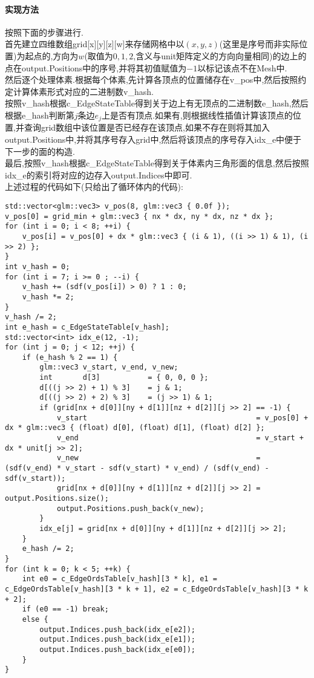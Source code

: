 \documentclass{ctexart}
\begin{document}
\paragraph{实现方法}
按照下面的步骤进行.\\
\indent 首先建立四维数组{\codefont grid[x][y][z][w]}来存储网格中以$(x,y,z)$(这里是序号而非实际位置)为起点的,方向为$w$(取值为$0,1,2$,含义与{\codefont unit}矩阵定义的方向向量相同)的边上的点在{\codefont output.Positions}中的序号,并将其初值赋值为$-1$以标记该点不在Mesh中.\\
\indent 然后逐个处理体素.根据每个体素,先计算各顶点的位置储存在{\codefont v\_pos}中,然后按照约定计算体素形式对应的二进制数{\codefont v\_hash}.\\
\indent 按照{\codefont v\_hash}根据{\codefont c\_EdgeStateTable}得到关于边上有无顶点的二进制数{\codefont e\_hash},然后根据{\codefont e\_hash}判断第$j$条边$e_j$上是否有顶点.如果有,则根据线性插值计算该顶点的位置,并查询{\codefont grid}数组中该位置是否已经存在该顶点,如果不存在则将其加入{\codefont output.Positions}中,并将其序号存入{\codefont grid}中,然后将该顶点的序号存入{\codefont idx\_e}中便于下一步的面的构造.\\
\indent 最后,按照{\codefont v\_hash}根据{\codefont c\_EdgeStateTable}得到关于体素内三角形面的信息,然后按照{\codefont idx\_e}的索引将对应的边存入{\codefont output.Indices}中即可.\\
\indent 上述过程的代码如下(只给出了循环体内的代码):
\begin{lstlisting}
std::vector<glm::vec3> v_pos(8, glm::vec3 { 0.0f });
v_pos[0] = grid_min + glm::vec3 { nx * dx, ny * dx, nz * dx };
for (int i = 0; i < 8; ++i) {
    v_pos[i] = v_pos[0] + dx * glm::vec3 { (i & 1), ((i >> 1) & 1), (i >> 2) };
}
int v_hash = 0;
for (int i = 7; i >= 0 ; --i) {
    v_hash += (sdf(v_pos[i]) > 0) ? 1 : 0;
    v_hash *= 2;
}
v_hash /= 2;
int e_hash = c_EdgeStateTable[v_hash];
std::vector<int> idx_e(12, -1);
for (int j = 0; j < 12; ++j) {
    if (e_hash % 2 == 1) {
        glm::vec3 v_start, v_end, v_new;
        int       d[3]           = { 0, 0, 0 };
        d[((j >> 2) + 1) % 3]    = j & 1;
        d[((j >> 2) + 2) % 3]    = (j >> 1) & 1;
        if (grid[nx + d[0]][ny + d[1]][nz + d[2]][j >> 2] == -1) {
            v_start                                       = v_pos[0] + dx * glm::vec3 { (float) d[0], (float) d[1], (float) d[2] };
            v_end                                         = v_start + dx * unit[j >> 2];
            v_new                                         = (sdf(v_end) * v_start - sdf(v_start) * v_end) / (sdf(v_end) - sdf(v_start));
            grid[nx + d[0]][ny + d[1]][nz + d[2]][j >> 2] = output.Positions.size();
            output.Positions.push_back(v_new);
        }
        idx_e[j] = grid[nx + d[0]][ny + d[1]][nz + d[2]][j >> 2];
    }
    e_hash /= 2;
}
for (int k = 0; k < 5; ++k) {
    int e0 = c_EdgeOrdsTable[v_hash][3 * k], e1 = c_EdgeOrdsTable[v_hash][3 * k + 1], e2 = c_EdgeOrdsTable[v_hash][3 * k + 2];
    if (e0 == -1) break;
    else {
        output.Indices.push_back(idx_e[e2]);
        output.Indices.push_back(idx_e[e1]);
        output.Indices.push_back(idx_e[e0]);
    }
}
\end{lstlisting}
\end{document}
